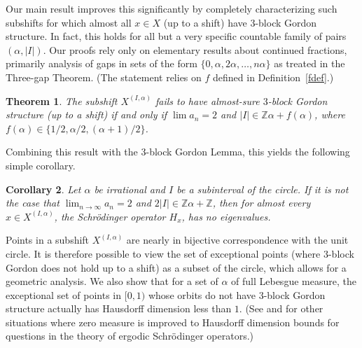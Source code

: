 \documentclass[11pt,reqno]{amsart}
\newtheorem{theorem}{Theorem}[section]
\newtheorem{corollary}[theorem]{Corollary}
\theoremstyle{definition}
\theoremstyle{plain}
\begin{document}
Our main result improves this significantly by completely characterizing such subshifts for which almost all $x \in X$ (up to a shift) have $3$-block Gordon structure. In fact, this holds for all but a very specific countable family of pairs
$(\alpha, |I|)$. Our proofs rely only on elementary results about continued fractions, primarily analysis of gaps in sets of the form $\{0, \alpha, 2\alpha, \ldots, n\alpha\}$ as treated in the Three-gap Theorem. (The statement relies on $f$ defined in Definition~\ref{fdef}.)

\begin{theorem}\label{mainthm}
The subshift $X^{(I, \alpha)}$ fails to have almost-sure $3$-block Gordon structure (up to a shift) if and only if  
$\lim a_n = 2$ and $|I| \in \mathbb{Z}\alpha + f(\alpha)$, where 
$f(\alpha) \in \{1/2, \alpha/2, (\alpha+1)/2\}$.
\end{theorem}
Combining this result with the 3-block Gordon Lemma, this yields the following simple corollary.
\begin{corollary}\label{Improving_eigenvalue_corollary}
    Let $\alpha$ be irrational and $I$ be a subinterval of the circle. If it is not the case that $\lim_{n \to \infty} a_n = 2$ and $2|I| \in \mathbb{Z}\alpha + \mathbb{Z}$, then for almost every $x \in X^{(I,\alpha)}$, the Schr\"{o}dinger operator $H_x$, has no eigenvalues.
\end{corollary}




Points in a subshift $X^{(I,\alpha)}$ are nearly in bijective correspondence with the unit circle. It is therefore possible to view the set of exceptional points (where $3$-block Gordon does not hold up to a shift) as a subset of the circle, which allows for a geometric analysis. We also show that for a set of $\alpha$ of full Lebesgue measure, 
the exceptional set of points in $[0,1)$ whose orbits do not have $3$-block Gordon structure actually has Hausdorff dimension less than $1$. (See \cite{DEGT} and \cite{JK} for other situations where zero measure is improved to Hausdorff dimension bounds for questions in the theory of ergodic Schr\"{o}dinger operators.)
\end{document}

